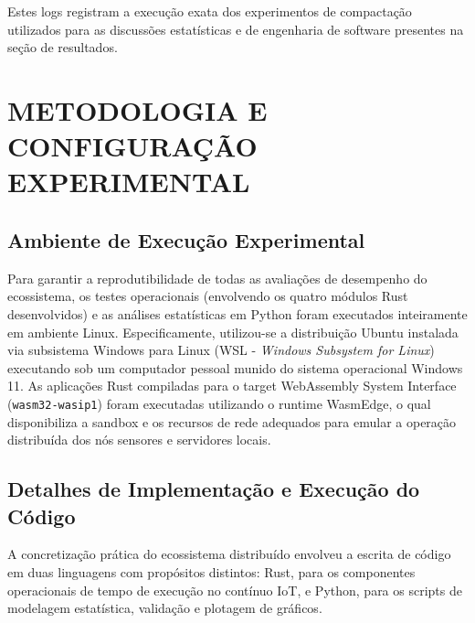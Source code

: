 \documentclass[
	12pt,
	openright,
	oneside,
	a4paper,
	english,
	brazil
	]{abntex2}
\begin{document}
Estes logs registram a execução exata dos experimentos de compactação utilizados para as discussões estatísticas e de engenharia de software presentes na seção de resultados.

\chapter{METODOLOGIA E CONFIGURAÇÃO EXPERIMENTAL}
\label{cap:metodologia}

\section{Ambiente de Execução Experimental}

Para garantir a reprodutibilidade de todas as avaliações de desempenho do ecossistema, os testes operacionais (envolvendo os quatro módulos Rust desenvolvidos) e as análises estatísticas em Python foram executados inteiramente em ambiente Linux. Especificamente, utilizou-se a distribuição Ubuntu instalada via subsistema Windows para Linux (WSL - \textit{Windows Subsystem for Linux}) executando sob um computador pessoal munido do sistema operacional Windows 11. As aplicações Rust compiladas para o target WebAssembly System Interface (\texttt{wasm32-wasip1}) foram executadas utilizando o runtime WasmEdge, o qual disponibiliza a sandbox e os recursos de rede adequados para emular a operação distribuída dos nós sensores e servidores locais.

\section{Detalhes de Implementação e Execução do Código}

A concretização prática do ecossistema distribuído envolveu a escrita de código em duas linguagens com propósitos distintos: Rust, para os componentes operacionais de tempo de execução no contínuo IoT, e Python, para os scripts de modelagem estatística, validação e plotagem de gráficos.
\end{document}
